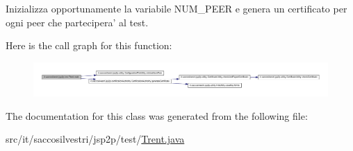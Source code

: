 \-Inizializza opportunamente la variabile \-N\-U\-M\-\_\-\-P\-E\-E\-R e genera un certificato per ogni peer che partecipera' al test. 



\-Here is the call graph for this function\-:
\nopagebreak
\begin{figure}[H]
\begin{center}
\leavevmode
\includegraphics[width=350pt]{classit_1_1saccosilvestri_1_1jsp2p_1_1test_1_1_trent_a03decc1dc7f0fb8a854c0bcda116e6ce_cgraph}
\end{center}
\end{figure}




\-The documentation for this class was generated from the following file\-:\begin{DoxyCompactItemize}
\item 
src/it/saccosilvestri/jsp2p/test/\hyperlink{_trent_8java}{\-Trent.\-java}\end{DoxyCompactItemize}
